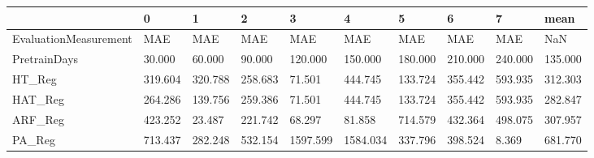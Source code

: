 \begin{tabular}{llllllllll}
\toprule
{} &       0 &       1 &       2 &        3 &        4 &       5 &       6 &       7 &    mean \\
\midrule
EvaluationMeasurement &     MAE &     MAE &     MAE &      MAE &      MAE &     MAE &     MAE &     MAE &     NaN \\
PretrainDays          &  30.000 &  60.000 &  90.000 &  120.000 &  150.000 & 180.000 & 210.000 & 240.000 & 135.000 \\
HT\_Reg                & 319.604 & 320.788 & 258.683 &   71.501 &  444.745 & 133.724 & 355.442 & 593.935 & 312.303 \\
HAT\_Reg               & 264.286 & 139.756 & 259.386 &   71.501 &  444.745 & 133.724 & 355.442 & 593.935 & 282.847 \\
ARF\_Reg               & 423.252 &  23.487 & 221.742 &   68.297 &   81.858 & 714.579 & 432.364 & 498.075 & 307.957 \\
PA\_Reg                & 713.437 & 282.248 & 532.154 & 1597.599 & 1584.034 & 337.796 & 398.524 &   8.369 & 681.770 \\
\bottomrule
\end{tabular}
